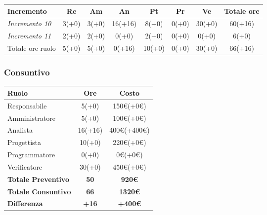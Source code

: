 {{{{{{{{{{	\begin{center}
		\renewcommand{\arraystretch}{1.4}
		\begin{tabularx}{\textwidth}{|X|c|c|c|c|c|c|c|}
			\hline
			\rowcolor{airforceblue}
			\textbf{Incremento} & \textbf{Re} & \textbf{Am} & \textbf{An} & \textbf{Pt} & \textbf{Pr} & \textbf{Ve} & \textbf{Totale ore}\\
			\hline
			\textit{Incremento 10} & 3(+0) & 3(+0) & 16(+16) & 8(+0) & 0(+0) & 30(+0) & 60(+16)\\
			\hline
			\textit{Incremento 11} & 2(+0) & 2(+0) & 0(+0) & 2(+0) & 0(+0) & 0(+0) & 6(+0)\\
			\hline
			Totale ore ruolo & 5(+0) & 5(+0) & 0(+16) & 10(+0) & 0(+0) & 30(+0) & 66(+16)\\
			\hline
		\end{tabularx}
	\end{center}

	
	\subsubsection{Consuntivo}\label{ConsuntivoTerzoPeriodoDiProgettazioneDiDettaglioCodificaIncrementiCosto}
	
	\quad
	\def\tabularxcolumn#1{m{#1}}
	{
		\begin{center}
			\renewcommand{\arraystretch}{1.4}
			\begin{tabularx}{10cm}{|X|c|c|}
				\hline
				\rowcolor{airforceblue}
				\textbf{Ruolo} & \textbf{Ore} & \textbf{Costo}\\
				\hline
				Responsabile & 5(+0) & 150\euro(+0\euro)\\
				\hline
				Amministratore & 5(+0) & 100\euro(+0\euro)\\
				\hline
				Analista & 16(+16) & 400\euro(+400\euro)\\
				\hline
				Progettista & 10(+0) & 220\euro(+0\euro)\\
				\hline
				Programmatore & 0(+0) & 0\euro(+0\euro)\\
				\hline
				Verificatore & 30(+0) & 450\euro(+0\euro)\\
				\hline
				\textbf{Totale Preventivo} & \textbf{50} & \textbf{920\euro}\\
				\hline
				\textbf{Totale Consuntivo} & \textbf{66} & \textbf{1320\euro}\\
				\hline
				\textbf{Differenza} & \textbf{+16} & \textbf{+400\euro}
			\end{tabularx}
		\end{center}
		
}}}}}}}}}}}
